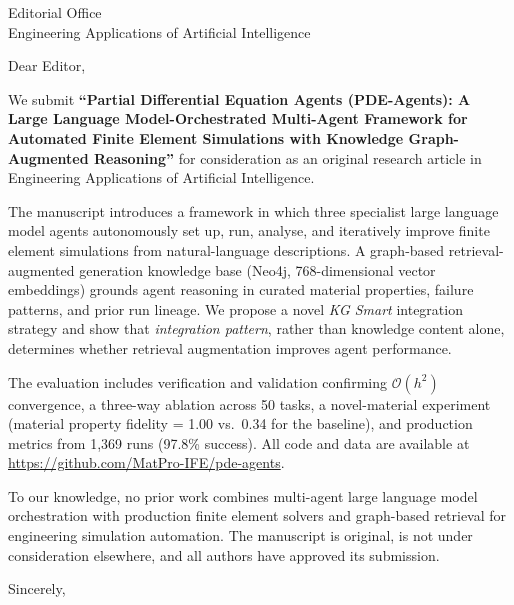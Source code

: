 \documentclass[11pt]{letter}
\date{\today}
\begin{document}
\begin{letter}{Editorial Office\\
Engineering Applications of Artificial Intelligence}

\opening{Dear Editor,}

We submit \textbf{``Partial Differential Equation Agents (PDE-Agents): A Large
Language Model-Orchestrated Multi-Agent Framework for Automated Finite Element
Simulations with Knowledge Graph-Augmented Reasoning''} for consideration as an
original research article in Engineering Applications of Artificial Intelligence.

The manuscript introduces a framework in which three specialist large language
model agents autonomously set up, run, analyse, and iteratively improve finite
element simulations from natural-language descriptions. A graph-based
retrieval-augmented generation knowledge base (Neo4j, 768-dimensional vector
embeddings) grounds agent reasoning in curated material properties, failure
patterns, and prior run lineage. We propose a novel \emph{KG Smart} integration
strategy and show that \emph{integration pattern}, rather than knowledge content
alone, determines whether retrieval augmentation improves agent performance.

The evaluation includes verification and validation confirming
$\mathcal{O}(h^2)$ convergence, a three-way ablation across 50 tasks, a
novel-material experiment (material property fidelity = 1.00 vs.\ 0.34 for the
baseline), and production metrics from 1,369 runs (97.8\% success). All code and
data are available at \url{https://github.com/MatPro-IFE/pde-agents}.

To our knowledge, no prior work combines multi-agent large language model
orchestration with production finite element solvers and graph-based retrieval
for engineering simulation automation. The manuscript is original, is not under
consideration elsewhere, and all authors have approved its submission.

\closing{Sincerely,}

\end{letter}
\end{document}
